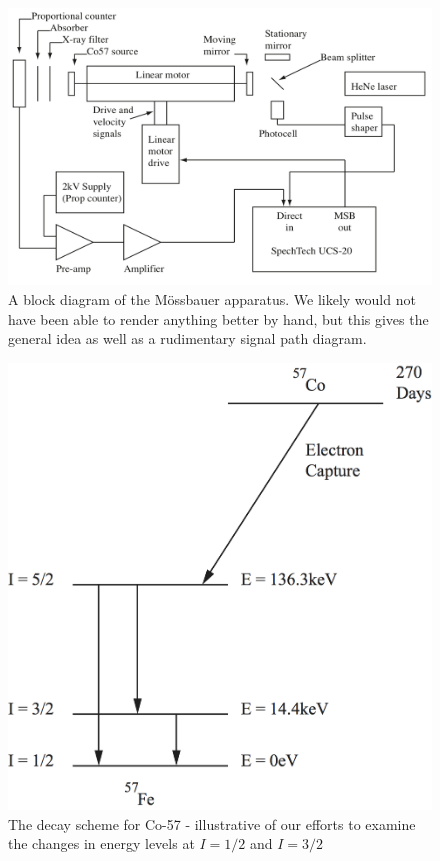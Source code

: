 \documentclass[reprint, nobibnotes, amssymb, amsmath, amsfonts, mathtools, mathrsfs, floatfix]{revtex4-1}
\newcommand{\moss}{M\"{o}ssbauer }
\begin{document}
\begin{widetext}
      \begin{figure}[h]
        \centering
        \includegraphics[width=\linewidth]{apparatus.png}
        \caption{A block diagram of the \moss apparatus.  We likely would not have been able to render anything better by hand, but this gives the general idea as well as a rudimentary signal path diagram.~\cite{lab_manual}~\label{apparatus}}
      \end{figure}

      \begin{figure}[h]
        \centering
        \includegraphics[width=\linewidth]{Co_57_decay.png}
        \caption{The decay scheme for Co-57 - illustrative of our efforts to examine the changes in energy levels at $I = 1/2$ and $I = 3/2$~\cite{lab_manual}~\label{co_57}}
      \end{figure}


\end{widetext}
\end{document}
